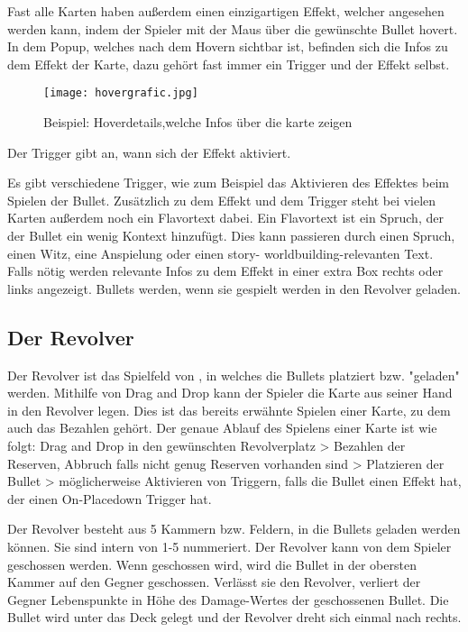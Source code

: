 Fast alle Karten haben außerdem einen einzigartigen Effekt,
welcher angesehen werden kann, indem der Spieler mit der Maus über die gewünschte Bullet hovert.
In dem Popup, welches nach dem Hovern sichtbar ist, befinden sich die Infos zu dem Effekt der Karte,
dazu gehört fast immer ein Trigger und der Effekt selbst.

\begin{figure}[H]
    \texttt{[image: hovergrafic.jpg]}
    \caption{Beispiel: Hoverdetails,welche Infos über die karte zeigen}
\end{figure}


Der Trigger gibt an, wann sich der Effekt aktiviert.


Es gibt verschiedene Trigger, wie zum Beispiel das Aktivieren des Effektes beim Spielen der Bullet.
Zusätzlich zu dem Effekt und dem Trigger steht bei vielen Karten außerdem noch ein Flavortext dabei.
Ein Flavortext ist ein Spruch, der der Bullet ein wenig Kontext hinzufügt.
Dies kann passieren durch einen Spruch, einen Witz, eine Anspielung oder einen story- \bzw worldbuilding-relevanten Text.
Falls nötig werden relevante Infos zu dem Effekt in einer extra Box rechts oder links angezeigt.
Bullets werden, wenn sie gespielt werden in den Revolver geladen.

\subsection{Der Revolver}\label{der_revolver}
Der Revolver ist das Spielfeld von \FF, in welches die Bullets platziert bzw. "geladen" werden.
Mithilfe von Drag and Drop kann der Spieler die Karte aus seiner Hand in den Revolver legen.
Dies ist das bereits erwähnte Spielen einer Karte, zu dem auch das Bezahlen gehört.
Der genaue Ablauf des Spielens einer Karte ist wie folgt:
Drag and Drop in den gewünschten Revolverplatz > Bezahlen der Reserven, Abbruch falls nicht genug Reserven vorhanden sind > Platzieren der Bullet > möglicherweise Aktivieren von Triggern, falls die Bullet einen Effekt hat, der einen On-Placedown Trigger hat.


Der Revolver besteht aus 5 Kammern bzw. Feldern, in die Bullets geladen werden können.
Sie sind intern von 1-5 nummeriert.
Der Revolver kann von dem Spieler geschossen werden. Wenn geschossen wird, wird die Bullet in der obersten Kammer auf den Gegner geschossen.
Verlässt sie den Revolver, verliert der Gegner Lebenspunkte in Höhe des Damage-Wertes der geschossenen Bullet.
Die Bullet wird unter das Deck gelegt und der Revolver dreht sich einmal nach rechts.

